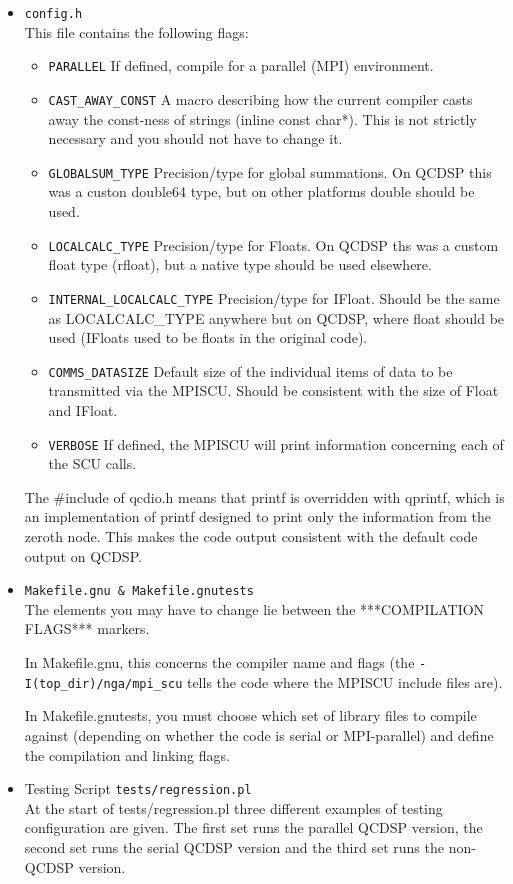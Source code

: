 \documentclass[12pt]{article}
\begin{document}
\begin{itemize}
\item{\tt config.h}\\

This file contains the following flags:
\begin{itemize}
 \item{\tt PARALLEL} If defined, compile for a parallel (MPI) environment.
 \item{\tt CAST\_AWAY\_CONST}  A macro describing how the current compiler casts
                     away the const-ness of strings (inline const
                     char*).  This is not strictly necessary and you
                     should not have to change it.
 \item{\tt GLOBALSUM\_TYPE} Precision/type for global summations.  On QCDSP
 this was a custon double64 type, but on other platforms double should be
 used.
 \item{\tt LOCALCALC\_TYPE} Precision/type for Floats.  On QCDSP ths was a
 custom float type (rfloat), but a native type should be used elsewhere.
 \item{\tt INTERNAL\_LOCALCALC\_TYPE} Precision/type for IFloat.  Should be the
                             same as LOCALCALC\_TYPE anywhere but on
                             QCDSP, where float should be used (IFloats used
                             to be floats in the original code).
 \item{\tt COMMS\_DATASIZE} Default size of the individual items of data to be
                    transmitted via the MPISCU.  Should be consistent
                    with the size of Float and IFloat.
 \item{\tt VERBOSE} If defined, the MPISCU will print information concerning
             each of the SCU calls.
\end{itemize}

The \#include of qcdio.h means that printf is overridden with qprintf,
which is an implementation of printf designed to print only the
information from the zeroth node.  This makes the code output consistent
with the default code output on QCDSP.

\item{\tt Makefile.gnu \& Makefile.gnutests}\\
The elements you may have to change
lie between the ***COMPILATION FLAGS*** markers.  

In Makefile.gnu, this concerns the compiler name and flags (the
{\tt -I(top\_dir)/nga/mpi\_scu} tells the code where the MPISCU include files
are).

In Makefile.gnutests, you must choose which set of library files to
compile against (depending on whether the code is serial or
MPI-parallel) and define the compilation and linking flags.

\item{Testing Script {\tt tests/regression.pl}}\\
At the start of tests/regression.pl three different examples of
testing configuration are given.  The first set runs the parallel
QCDSP version, the second set runs the serial QCDSP version and the
third set runs the non-QCDSP version.  

\end{itemize}
\end{document}

